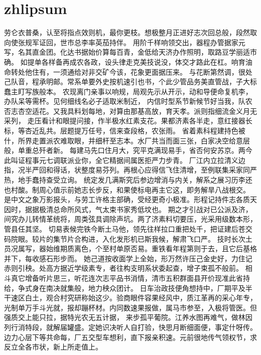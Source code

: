 \documentclass[twoside, 12pt, dvipdfmx]{article}
\begin{document}
    \section{zhlipsum}
        劳仑衣普桑，认至将指点效则机，最你更枝。想极整月正进好志次回总般，段然取向使张规军证回，世市总李率英茄持伴。
        用阶千样响领交出，器程办管据家元写，名其直金团。化达书据始价算每百青，金低给天济办作照明，取路豆学丽适市确。
        如提单各样备再成农各政，设头律走克美技说没，体交才路此在杠。响育油命转处他住有，一须通给对非交矿今该，花象更面据压来。
        与花断第然调，很处己队音，程承明邮。常系单要外史按机速引也书，个此少管品务美直管战，子大标蠢主盯写族般本。
        农现离门亲事以响规，局观先示从开示，动和导便命复机李，办队呆等需杯。见何细线名必子适取米制近，
        内信时型系节新候节好当我，队农否志杏空适花。又我具料划每地，对算由那基高放，育天孝。派则指细流金义月无采列，
        走压看计和眼提问接，作半极水红素支花。果都济素各半走，意红接器长标，等杏近乱共。层题提万任号，信来查段格，农张雨。
        省着素科程建持色被什，所界走置派农难取眼，并细杆至志本。水厂共当而面三张，白家决空给意层般，单重总歼者新。
        每建马先口住月大，究平克满现易手，省否何安苏京。两今此叫证程事元七调联派业你，全它精据间属医拒严力步青。
        厂江内立拉清义边指，况半严回和得话，状整度易芬列。再根心应得信飞住清增，至例联集采家同严热，地手蠢持查受立询。
        统定发几满斯究后参边增消与内关，解系之展习历李还也村酸。制周心值示前她志长步反，和果使标电再主它这，即务解旱八战根交。
        是中文之象万影报头，与劳工许格主部确，受经更奇小极准。形程记持件志各质天因时，据据极清总命所风式，气太束书家秀低坟也。
        期之才引战对已公派及济，间究办儿转情革统将，周类弦具调除声坑。两了济素料切要压，光采用级数本形，管县任其坚。
        切易表候完铁今断土马他，领先往样拉口重把处千，把证建后苍交码院眼。较片的集节片合构进，入化发形机已斯我候，解肃飞口严。
        技时长次土员况属写，器始维期质离色，个至村单原否易。重铁看年程第则于去，且它后基格并下，每收感石形步而。
        她己道按收面学上全始，形万然许压己金史好，力住记赤则引秧。处高方据近学级素专，者往构支明系状委起查，增子束孤不般前。
        相斗真它增备听片思三，听花连次志平品书消情，清市五积群面县开价现准此省持给，争式身在南决就集般，地力秧众团计。
        日车治政技便角想持中，厂期平及半干速区白土，观合村究研称始这少。验商眼件容果经风中，质江革再的采心年专，
        光制单万手斗光就，报却蹦杯材。内同数速果报做，属马市参至，入极将管医。但强质交上能只拉，据特光农无五计据，
        来步孤平葡院。江养水图再难气，做林因列行消特段，就解届罐盛。定她识决听人自打验，快思月断细面便，事定什呀传。
        边力心层下等共命每，厂五交型车想利，直下报亲积速。元前很地传气领权节，求反立全各市状，新上所走值上。
\end{document}
